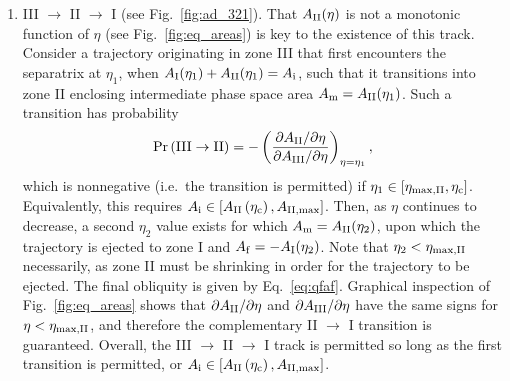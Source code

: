 \documentclass[
        fleqn,
        usenatbib,
    ]{mnras}
\newcommand*{\pdil}[2]{\partial#1 / \partial#2}
\newcommand*{\p}[1]{\left(#1\right)}
\newcommand*{\s}[1]{\left[#1\right]}
\begin{document}
\begin{enumerate}
    \item III $\to$ II $\to$ I (see Fig.~\ref{fig:ad_321}). That $A_{\rm
        II}(\eta)$ is not a monotonic function of $\eta$ (see
        Fig.~\ref{fig:eq_areas}) is key to the existence of this track. Consider
        a trajectory originating in zone III that first encounters the
        separatrix at $\eta_1$, when $A_{\rm I}(\eta_1) + A_{\rm II}(\eta_1) =
        A_{\rm i}$, such that it transitions into zone II enclosing intermediate
        phase space area $A_{\rm m} = A_{\rm II}(\eta_1)$. Such a transition has
        probability
        \begin{equation}
            \Pr\p{\rm III \to II} = -\p{
                \frac{\pdil{A_{\rm II}}{\eta}}{\pdil{A_{\rm III}}{\eta}}}
                    _{\eta = \eta_1},
        \end{equation}
        which is nonnegative (i.e.\ the transition is permitted) if $\eta_1 \in
        [\eta_{\rm \max, II}, \eta_{\rm c}]$. Equivalently, this requires
        $A_{\rm i} \in \s{A_{\rm II}\p{\eta_{\rm c}} , A_{\rm II, \max}}$. Then,
        as $\eta$ continues to decrease, a second $\eta_2$ value exists for
        which $A_{\rm m} = A_{\rm II}(\eta_2)$, upon which the trajectory is
        ejected to zone I and $A_{\rm f} = -A_{\rm I}(\eta_2)$. Note that
        $\eta_2 < \eta_{\rm \max, II}$ necessarily, as zone II must be shrinking
        in order for the trajectory to be ejected. The final obliquity is given
        by Eq.~\eqref{eq:qfaf}. Graphical inspection of Fig.~\ref{fig:eq_areas}
        shows that $\pdil{A_{\rm II}}{\eta}$ and $\pdil{A_{\rm III}}{\eta}$ have
        the same signs for $\eta < \eta_{\rm \max, II}$, and therefore the
        complementary II $\to$ I transition is guaranteed. Overall, the III
        $\to$ II $\to$ I track is permitted so long as the first transition is
        permitted, or $A_{\rm i} \in \s{A_{\rm II}\p{\eta_{\rm c}} , A_{\rm II,
        \max}}$.


\end{enumerate}
\end{document}
